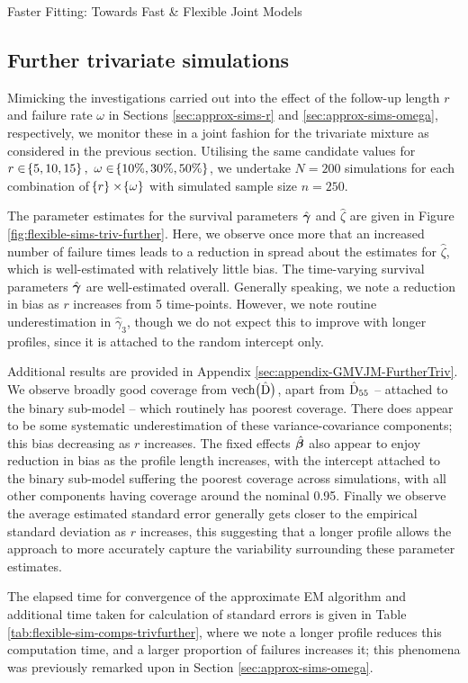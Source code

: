 \begin{chapter}{\label{cha:flexible}Faster Fitting: Towards Fast \& Flexible Joint Models}
\subsection{Further trivariate simulations}\label{sec:flexible-sim-trivfurther}
Mimicking the investigations carried out into the effect of the follow-up length $r$ and failure rate $\omega$ in Sections \ref{sec:approx-sims-r} and \ref{sec:approx-sims-omega}, respectively, we monitor these in a joint fashion for the trivariate mixture as considered in the previous section. Utilising the same candidate values for $r\in\!\left\{5,10,15\right\},\ \omega\in\!\left\{10\%,30\%,50\%\right\}$, we undertake $N=200$ simulations for each combination of $\!\left\{ r\right\}\times\!\left\{\omega\right\}$ with simulated sample size $n=250$. 

The parameter estimates for the survival parameters $\hat{\bm{\gamma}}$ and $\hat{\zeta}$ are given in Figure \ref{fig:flexible-sims-triv-further}. Here, we observe once more that an increased number of failure times leads to a reduction in spread about the estimates for $\hat{\zeta}$, which is well-estimated with relatively little bias. The time-varying survival parameters $\hat{\bm{\gamma}}$ are well-estimated overall. Generally speaking, we note a reduction in bias as $r$ increases from 5 time-points. However, we note routine underestimation in $\hat{\gamma}_3$, though we do not expect this to improve with longer profiles, since it is attached to the random intercept only.

Additional results are provided in Appendix \ref{sec:appendix-GMVJM-FurtherTriv}. We observe broadly good coverage from $\text{vech}\big(\hat{\mathrm{D}}\big)$, apart from $\hat{\mathrm{D}}_{55}$ -- attached to the binary sub-model -- which routinely has poorest coverage. There does appear to be some systematic underestimation of these variance-covariance components; this bias decreasing as $r$ increases. The fixed effects $\hat{\bm{\beta}}$ also appear to enjoy reduction in bias as the profile length increases, with the intercept attached to the binary sub-model suffering the poorest coverage across simulations, with all other components having coverage around the nominal 0.95. Finally we observe the average estimated standard error generally gets closer to the empirical standard deviation as $r$ increases, this suggesting that a longer profile allows the approach to more accurately capture the variability surrounding these parameter estimates. 

The elapsed time for convergence of the approximate EM algorithm and additional time taken for calculation of standard errors is given in Table \ref{tab:flexible-sim-comps-trivfurther}, where we note a longer profile reduces this computation time, and a larger proportion of failures increases it; this phenomena was previously remarked upon in Section \ref{sec:approx-sims-omega}. 


\end{chapter}

